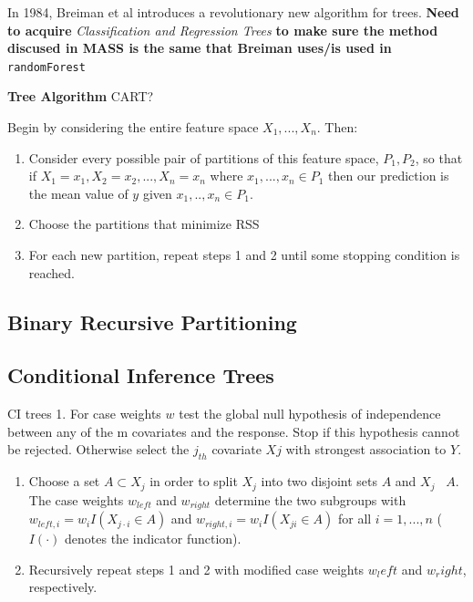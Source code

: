 \documentclass[12pt,twoside]{reedthesis}
\begin{document}
  In 1984, Breiman et al introduces a revolutionary new algorithm for
  trees. \textbf{Need to acquire} \emph{Classification and Regression
  Trees} \textbf{to make sure the method discused in MASS is the same that
  Breiman uses/is used in} \texttt{randomForest}
  
  \textbf{Tree Algorithm} CART?
  
  Begin by considering the entire feature space \(X_1, ..., X_n\). Then:
  
  \begin{enumerate}
  \def\labelenumi{\arabic{enumi}.}
  \item
    Consider every possible pair of partitions of this feature space,
    \(P_1, P_2\), so that if \(X_1 = x_1 , X_2 = x_2,..., X_n = x_n\)
    where \({x_1,...,x_n} \in P_1\) then our prediction is the mean value
    of \(y\) given \(x_1,..,x_n \in P_1\).
  \item
    Choose the partitions that minimize RSS
  \item
    For each new partition, repeat steps 1 and 2 until some stopping
    condition is reached.
  \end{enumerate}
  
  \subsection{Binary Recursive
  Partitioning}\label{binary-recursive-partitioning}
  
  \subsection{Conditional Inference
  Trees}\label{conditional-inference-trees}
  
  CI trees 1. For case weights \(w\) test the global null hypothesis of
  independence between any of the m covariates and the response. Stop if
  this hypothesis cannot be rejected. Otherwise select the \(j_{th}\)
  covariate \(Xj\) with strongest association to \(Y\).
  
  \begin{enumerate}
  \def\labelenumi{\arabic{enumi}.}
  \setcounter{enumi}{1}
  \item
    Choose a set \(A \subset X_{j}\) in order to split \(X_{j}\) into two
    disjoint sets \(A\) and \(X_{j}\) ~\(A\). The case weights
    \(w_{left}\) and \(w_{right}\) determine the two subgroups with
    \(w_{left,i} = w_iI(X_{j\cdot i} \in A)\) and
    \(w_{right,i} = w_iI(X_{ji} \in A)\) for all \(i = 1,...,n\) (
    \(I(·)\) denotes the indicator function).
  \item
    Recursively repeat steps 1 and 2 with modified case weights \(w_left\)
    and \(w_right\), respectively.
  \end{enumerate}
  
\end{document}
